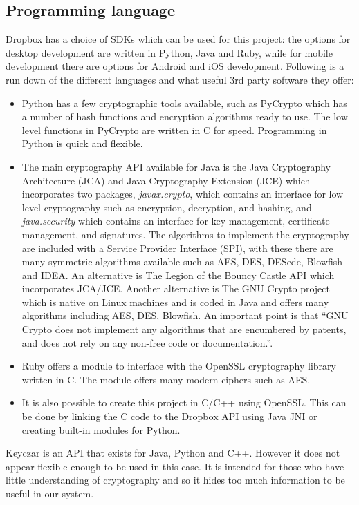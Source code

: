\documentclass[12pt, titlepage]{article}
\begin{document}
\subsection{Programming language}
Dropbox has a choice of SDKs which can be used for this project: the options for desktop development are written in Python, Java and Ruby, while for mobile development there are options for Android and iOS development.
\newline Following is a run down of the different languages and what useful 3rd party software they offer:
\begin{itemize}
\item Python has a few cryptographic tools available, such as PyCrypto which has a number of hash functions and encryption algorithms ready to use. The low level functions in PyCrypto are written in C for speed.\cite{pyCrypto} Programming in Python is quick and flexible.
\item The main cryptography API available for Java is the Java Cryptography Architecture (JCA) and Java Cryptography Extension (JCE) which incorporates two packages, \textit{javax.crypto}, which contains an interface for low level cryptography such as encryption, decryption, and hashing, and \textit{java.security} which contains an interface for key management, certificate management, and signatures. The algorithms to implement the cryptography are included with a Service Provider Interface (SPI), with these there are many symmetric algorithms available such as AES, DES, DESede, Blowfish and IDEA\cite{javaJCA}. An alternative is The Legion of the Bouncy Castle API which incorporates JCA/JCE\cite{bouncyCastle}. Another alternative is The GNU Crypto project which is native on Linux machines and is coded in Java and offers many algorithms including AES, DES, Blowfish. An important point is that ``GNU Crypto does not implement any algorithms that are encumbered by patents, and does not rely on any non-free code or documentation.''\cite{gnuCrypto}.
\item Ruby offers a module to interface with the OpenSSL cryptography library written in C. The module offers many modern ciphers such as AES.\cite{rubyOpenSSL}
\item It is also possible to create this project in C/C++ using OpenSSL. This can be done by linking the C code to the Dropbox API using Java JNI or creating built-in modules for Python.
\end{itemize}
Keyczar is an API that exists for Java, Python and C++.\cite{keyczar} However it does not appear flexible enough to be used in this case. It is intended for those who have little understanding of cryptography and so it hides too much information to be useful in our system.
\end{document}
